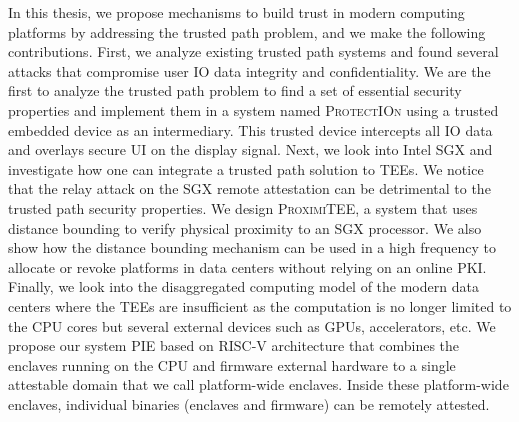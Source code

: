 In this thesis, we propose mechanisms to build trust in modern computing platforms by addressing the trusted path problem, and we make the following contributions. First, we analyze existing trusted path systems and found several attacks that compromise user IO data integrity and confidentiality. We are the first to analyze the trusted path problem to find a set of essential security properties and implement them in a system named \textsc{ProtectIOn} using a trusted embedded device as an intermediary. This trusted device intercepts all IO data and overlays secure UI on the display signal. Next, we look into Intel SGX and investigate how one can integrate a trusted path solution to TEEs. We notice that the relay attack on the SGX remote attestation can be detrimental to the trusted path security properties. We design \textsc{ProximiTEE}, a system that uses distance bounding to verify physical proximity to an SGX processor. We also show how the distance bounding mechanism can be used in a high frequency to allocate or revoke platforms in data centers without relying on an online PKI. Finally, we look into the disaggregated computing model of the modern data centers where the TEEs are insufficient as the computation is no longer limited to the CPU cores but several external devices such as GPUs, accelerators, etc. We propose our system PIE based on RISC-V architecture that combines the enclaves running on the CPU and firmware external hardware to a single attestable domain that we call platform-wide enclaves. Inside these platform-wide enclaves, individual binaries (enclaves and firmware) can be remotely attested.
  

\endgroup
